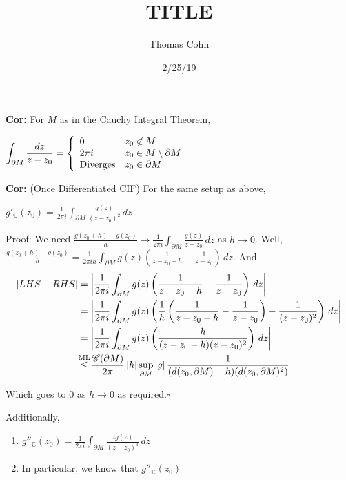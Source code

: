 \documentclass[10pt,letterpaper]{article}
\author{Thomas Cohn}
\title{TITLE}
\date{2/25/19} %
\newcommand{\n}{\hfill\break}
\newcommand{\cor}[1]{\par\noindent\settowidth{\hangindent}{\textbf{Cor: }}\textbf{Cor: }#1\n}
\newcommand{\proven}{\;$\square$\n}
\newcommand{\ptxt}[1]{\textrm{\textnormal{#1}}}
\newcommand{\inlineeq}[1]{\centerline{$\displaystyle #1$}}
\newcommand{\complex}{\mathbb{C}}
\newcommand{\C}{\complex}
\newcommand{\cut}{\setminus}
\newcommand{\abs}[1]{\left|#1\right|}
\newcommand{\paren}[1]{\left(#1\right)}
\begin{document}
\maketitle
\setlength\RaggedRightParindent{\parindent}
\RaggedRight

\cor{For $M$ as in the Cauchy Integral Theorem,\n
\inlineeq{
	\int_{\partial{}M}\frac{dz}{z-z_{0}}=\left\{\begin{array}{ll}
	0 & z_{0}\not\in{}M\\
	2\pi{}i & z_{0}\in{}M\cut\partial{}M\\
	\ptxt{Diverges} & z_{0}\in\partial{}M
	\end{array}\right.
}}

\cor{(Once Differentiated CIF)\n
For the same setup as above,\n\inlineeq{
	g'_{\C}(z_{0})=\frac{1}{2\pi{}i}\int_{\partial{}M}\frac{g(z)}{(z-z_{0})^{2}}\,dz
}}

\par\noindent Proof: We need $\displaystyle\frac{g(z_{0}+h)-g(z_{0})}{h}\to\frac{1}{2\pi{}i}\int_{\partial{}M}\frac{g(z)}{z-z_{0}}\,dz$ as $h\to{}0$.\n
Well, $\displaystyle\frac{g(z_{0}+h)-g(z_{0})}{h}=\frac{1}{2\pi{}ih}\int_{\partial{}M}g(z)\paren{\frac{1}{z-z_{0}-h}-\frac{1}{z-z_{0}}}\,dz$. And
\begin{align*}
	\abs{LHS-RHS} & =\abs{\frac{1}{2\pi{}i}\int_{\partial{}M}g(z)\paren{\frac{1}{z-z_{0}-h}-\frac{1}{z-z_{0}}}\,dz}\\
	& =\abs{\frac{1}{2\pi{}i}\int_{\partial{}M}g(z)\paren{\frac{1}{h}\paren{\frac{1}{z-z_{0}-h}-\frac{1}{z-z_{0}}}-\frac{1}{(z-z_{0})^{2}}}\,dz}\\
	& =\abs{\frac{1}{2\pi{}i}\int_{\partial{}M}g(z)\paren{\frac{h}{(z-z_{0}-h)(z-z_{0})^{2}}}\,dz}\\
	& \overset{\mathclap{\ptxt{ML}}}{\le}\frac{\mathscr{C}(\partial{}M)}{2\pi}\abs{h}\underset{\partial{}M}{\sup}\abs{g}\frac{1}{(d(z_{0},\partial{}M)-h)(d(z_{0},\partial{}M)^{2})}
\end{align*}

\par\noindent Which goes to $0$ as $h\to{}0$ as required.\proven

\par\noindent Additionally,
\begin{enumerate}[label=\arabic*), topsep=0pt]
	\item $\displaystyle{}g''_{\C}(z_{0})=\frac{1}{2\pi{}i}\int_{\partial{}M}\frac{zg(z)}{(z-z_{0})^{3}}\,dz$
	\item In particular, we know that $g''_{\C}(z_{0})$
\end{enumerate}
\end{document}
